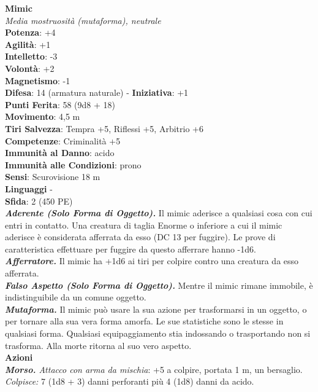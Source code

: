 \begin{multicols}{2}
\medskip\textbf{Mimic}\\
\emph{Media mostruosità (mutaforma), neutrale}\\
\textbf{Potenza}: +4\\
\textbf{Agilità}: +1\\
\textbf{Intelletto}: -3\\
\textbf{Volontà}: +2\\
\textbf{Magnetismo}: -1\\
\textbf{Difesa}: 14 (armatura naturale) - \textbf{Iniziativa}: +1\\
\textbf{Punti Ferita}: 58 (9d8 + 18)\\
\textbf{Movimento}: 4,5 m\\
\textbf{Tiri Salvezza}: Tempra +5, Riflessi +5, Arbitrio +6\\
\textbf{Competenze}: Criminalità +5\\
\textbf{Immunità al Danno}: acido\\
\textbf{Immunità alle Condizioni}: prono\\
\textbf{Sensi}: Scurovisione 18 m\\
\textbf{Linguaggi} -\\
\textbf{Sfida}: 2 (450 PE)\smallskip\\
\emph{\textbf{Aderente (Solo Forma di Oggetto).}} Il mimic aderisce a qualsiasi cosa con cui entri in contatto. Una creatura di taglia Enorme o inferiore a cui il mimic aderisce è considerata afferrata da esso (DC 13 per fuggire). Le prove di caratteristica effettuare per fuggire da questo afferrare hanno -1d6.\\
\emph{\textbf{Afferratore.}} Il mimic ha +1d6 ai tiri per colpire contro una creatura da esso afferrata.\\
\emph{\textbf{Falso Aspetto (Solo Forma di Oggetto).}} Mentre il mimic rimane immobile, è indistinguibile da un comune oggetto.\\
\emph{\textbf{Mutaforma.}} Il mimic può usare la sua azione per trasformarsi in un oggetto, o per tornare alla sua vera forma amorfa. Le sue statistiche sono le stesse in qualsiasi forma. Qualsiasi equipaggiamento stia indossando o trasportando non si trasforma. Alla morte ritorna al suo vero aspetto.\\
\smallskip\textbf{Azioni}\\
\emph{\textbf{Morso.} Attacco con arma da mischia}: +5 a colpire, portata 1 m, un bersaglio.\\
\emph{Colpisce:} 7 (1d8 + 3) danni perforanti più 4 (1d8) danni da acido.\\

\end{multicols}
